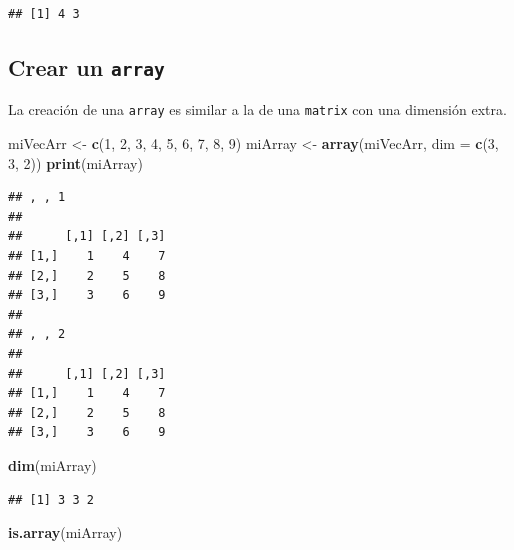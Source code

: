 \documentclass[
]{book}
\newenvironment{Shaded}{\begin{snugshade}}{\end{snugshade}}
\newcommand{\DataTypeTok}[1]{\textcolor[rgb]{0.13,0.29,0.53}{#1}}
\newcommand{\DecValTok}[1]{\textcolor[rgb]{0.00,0.00,0.81}{#1}}
\newcommand{\KeywordTok}[1]{\textcolor[rgb]{0.13,0.29,0.53}{\textbf{#1}}}
\newcommand{\NormalTok}[1]{#1}
\newcommand{\StringTok}[1]{\textcolor[rgb]{0.31,0.60,0.02}{#1}}
\begin{document}
\begin{verbatim}
## [1] 4 3
\end{verbatim}

\hypertarget{crear-un-array}{%
\subsection{\texorpdfstring{Crear un \texttt{array}}{Crear un array}}\label{crear-un-array}}

La creación de una \texttt{array} es similar a la de una \texttt{matrix} con una dimensión extra.

\begin{Shaded}
\begin{Highlighting}[]
\NormalTok{miVecArr <-}\StringTok{ }\KeywordTok{c}\NormalTok{(}\DecValTok{1}\NormalTok{, }\DecValTok{2}\NormalTok{, }\DecValTok{3}\NormalTok{, }\DecValTok{4}\NormalTok{, }\DecValTok{5}\NormalTok{, }\DecValTok{6}\NormalTok{, }\DecValTok{7}\NormalTok{, }\DecValTok{8}\NormalTok{, }\DecValTok{9}\NormalTok{)}
\NormalTok{miArray <-}\StringTok{ }\KeywordTok{array}\NormalTok{(miVecArr, }\DataTypeTok{dim =} \KeywordTok{c}\NormalTok{(}\DecValTok{3}\NormalTok{, }\DecValTok{3}\NormalTok{, }\DecValTok{2}\NormalTok{))}
\KeywordTok{print}\NormalTok{(miArray)}
\end{Highlighting}
\end{Shaded}

\begin{verbatim}
## , , 1
## 
##      [,1] [,2] [,3]
## [1,]    1    4    7
## [2,]    2    5    8
## [3,]    3    6    9
## 
## , , 2
## 
##      [,1] [,2] [,3]
## [1,]    1    4    7
## [2,]    2    5    8
## [3,]    3    6    9
\end{verbatim}

\begin{Shaded}
\begin{Highlighting}[]
\KeywordTok{dim}\NormalTok{(miArray)}
\end{Highlighting}
\end{Shaded}

\begin{verbatim}
## [1] 3 3 2
\end{verbatim}

\begin{Shaded}
\begin{Highlighting}[]
\KeywordTok{is.array}\NormalTok{(miArray)}
\end{Highlighting}
\end{Shaded}
\end{document}

